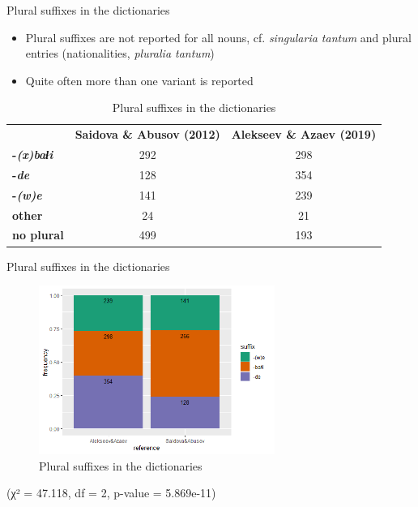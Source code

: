 \begin{frame}{Plural suffixes in the dictionaries}
\begin{itemize}
    \item Plural suffixes are not reported for all nouns, cf. \textit{singularia tantum} and plural entries (nationalities, \textit{pluralia tantum})
    \item Quite often more than one variant is reported
\end{itemize}
\begin{table}[]
\caption{Plural suffixes in the dictionaries}
\centering
\begin{tabular}{lcc}
          & \multicolumn{1}{l}{\textbf{Saidova \& Abusov (2012)}} & \multicolumn{1}{l}{\textbf{Alekseev \& Azaev (2019)}} \\
\textbf{-\textit{(x)baɬi}}  & 292                                          & 298                                          \\
\textbf{-\textit{de}}       & 128                                          & 354                                          \\
\textbf{-\textit{(w)e}}     & 141                                          & 239                                          \\
\textbf{other}     & 24                                           & 21                                           \\
\textbf{no plural} & 499                                          & 193                                         
\end{tabular}
\end{table}
\end{frame}

\begin{frame}{Plural suffixes in the dictionaries}
\begin{figure}[h]
\caption{Plural suffixes in the dictionaries}
\centering
\includegraphics[height=5.5cm]{images/plural.png}
\end{figure}
\centering
\small (χ² = 47.118, df = 2, p-value = 5.869e-11)
\end{frame}

